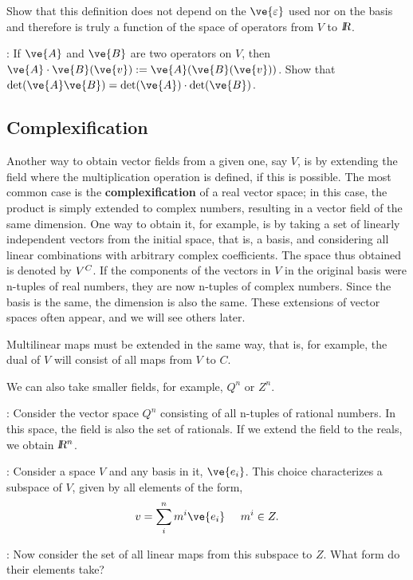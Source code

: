 \bpro Show that this definition does not depend on the $\ve{\varepsilon} $ used nor on the basis and therefore is truly a function of the space of operators from $V$ to $\mbox{\sl {l$\!\!\!\;\:\!$R}}$. \epro

\ejer: If $\ve{A}$ and $\ve{B}$ are two operators on $V$, then $\ve{A}\cdot \ve{B} (\ve{v}):= \ve{A}(\ve{B}(\ve{v}))$. Show that $\det(\ve{A}\ve{B})=\det(\ve{A})\cdot \det(\ve{B})$.

\subsection{Complexification}
\label{sub:Complexificacion}


Another way to obtain vector fields from a given one, say $V$, is by extending the field where the multiplication operation is defined, if this is possible. The most common case is the \textbf{complexification} of a real vector space; in this case, the product is simply extended to complex numbers, resulting in a vector field of the same dimension. One way to obtain it, for example, is by taking a set of linearly independent vectors from the initial space, that is, a basis, and considering all linear combinations with arbitrary complex coefficients. The space thus obtained is denoted by $V^{C}$. If the components of the vectors in $V$ in the original basis were n-tuples of real numbers, they are now n-tuples of complex numbers. Since the basis is the same, the dimension is also the same. These extensions of vector spaces often appear, and we will see others later.

Multilinear maps must be extended in the same way, that is, for example, the dual of $V$ will consist of all maps from $V$ to $C$.

We can also take smaller fields, for example, $Q^n$ or $Z^n$.

\ejem: Consider the vector space $Q^n$ consisting of all n-tuples of rational numbers. In this space, the field is also the set of rationals. If we extend the field to the reals, we obtain $\mbox{\sl {l$\!\!\!\;\:\!$R}$^n$}$.

\ejem: Consider a space $V$ and any basis in it, ${\ve{e_{i}}}$. This choice characterizes a subspace of $V$, given by all elements of the form, 
\[ 
v=\sum_{i}^{n} m^{i}\ve{e_{i}} \;\;\;\;\; m^{i} \in Z. 
\]

\ejer: Now consider the set of all linear maps from this subspace to $Z$. What form do their elements take?

